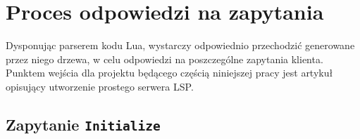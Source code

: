 \chapter{Proces odpowiedzi na zapytania}

Dysponując parserem kodu Lua, wystarczy odpowiednio przechodzić generowane przez niego drzewa, w celu odpowiedzi na poszczególne zapytania klienta. Punktem wejścia dla projektu będącego częścią niniejszej pracy jest artykuł \cite{lsp_sample} opisujący utworzenie prostego serwera LSP.

\section{Zapytanie \texttt{Initialize}}
